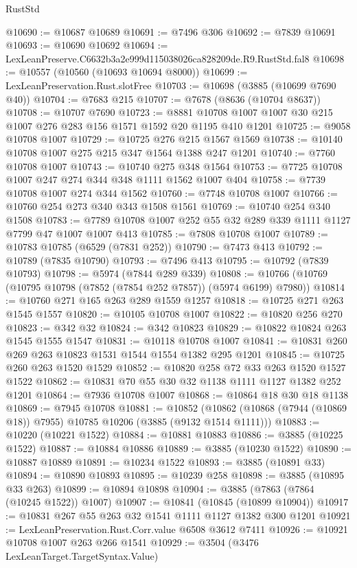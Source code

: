 \begin{lexlean}{RustStd}
\begin{coremodule}
@10690 := @10687 @10689
@10691 := @7496 @306
@10692 := @7839 @10691
@10693 := @10690 @10692
@10694 := LexLeanPreserve.C6632b3a2e999d115038026ca828209de.R9.RustStd.fal8
@10698 := @10557 (@10560 (@10693 @10694 @8000))
@10699 := LexLeanPreservation.Rust.slotFree
@10703 := @10698 (@3885 (@10699 @7690 @40))
@10704 := @7683 @215
@10707 := @7678 (@8636 (@10704 @8637))
@10708 := @10707 @7690
@10723 := @8881 @10708 @1007 @1007 @30 @215 @1007 @276 @283 @156 @1571 @1592 @20 @1195 @410 @1201
@10725 := @9058 @10708 @1007
@10729 := @10725 @276 @215 @1567 @1569
@10738 := @10140 @10708 @1007 @275 @215 @347 @1564 @1388 @247 @1201
@10740 := @7760 @10708 @1007
@10743 := @10740 @275 @348 @1564
@10753 := @7725 @10708 @1007 @247 @274 @344 @348 @1111 @1562 @1007 @404
@10758 := @7739 @10708 @1007 @274 @344 @1562
@10760 := @7748 @10708 @1007
@10766 := @10760 @254 @273 @340 @343 @1508 @1561
@10769 := @10740 @254 @340 @1508
@10783 := @7789 @10708 @1007 @252 @55 @32 @289 @339 @1111 @1127 @7799 @47 @1007 @1007 @413
@10785 := @7808 @10708 @1007
@10789 := @10783 @10785 (@6529 (@7831 @252))
@10790 := @7473 @413
@10792 := @10789 (@7835 @10790)
@10793 := @7496 @413
@10795 := @10792 (@7839 @10793)
@10798 := @5974 (@7844 @289 @339)
@10808 := @10766 (@10769 (@10795 @10798 (@7852 (@7854 @252 @7857)) (@5974 @6199) @7980))
@10814 := @10760 @271 @165 @263 @289 @1559 @1257
@10818 := @10725 @271 @263 @1545 @1557
@10820 := @10105 @10708 @1007
@10822 := @10820 @256 @270
@10823 := @342 @32
@10824 := @342 @10823
@10829 := @10822 @10824 @263 @1545 @1555 @1547
@10831 := @10118 @10708 @1007
@10841 := @10831 @260 @269 @263 @10823 @1531 @1544 @1554 @1382 @295 @1201
@10845 := @10725 @260 @263 @1520 @1529
@10852 := @10820 @258 @72 @33 @263 @1520 @1527 @1522
@10862 := @10831 @70 @55 @30 @32 @1138 @1111 @1127 @1382 @252 @1201
@10864 := @7936 @10708 @1007
@10868 := @10864 @18 @30 @18 @1138
@10869 := @7945 @10708
@10881 := @10852
    (@10862 (@10868 (@7944 (@10869 @18)) @7955) @10785 @10206 (@3885 (@9132 @1514 @1111)))
@10883 := @10220 (@10221 @1522)
@10884 := @10881 @10883
@10886 := @3885 (@10225 @1522)
@10887 := @10884 @10886
@10889 := @3885 (@10230 @1522)
@10890 := @10887 @10889
@10891 := @10234 @1522
@10893 := @3885 (@10891 @33)
@10894 := @10890 @10893
@10895 := @10239 @258
@10898 := @3885 (@10895 @33 @263)
@10899 := @10894 @10898
@10904 := @3885 (@7863 (@7864 (@10245 @1522)) @1007)
@10907 := @10841 (@10845 (@10899 @10904))
@10917 := @10831 @267 @55 @263 @32 @1541 @1111 @1127 @1382 @300 @1201
@10921 := LexLeanPreservation.Rust.Corr.value @6508 @3612 @7411
@10926 := @10921 @10708 @1007 @263 @266 @1541
@10929 := @3504 (@3476 LexLeanTarget.TargetSyntax.Value)

\end{coremodule}
\end{lexlean}
